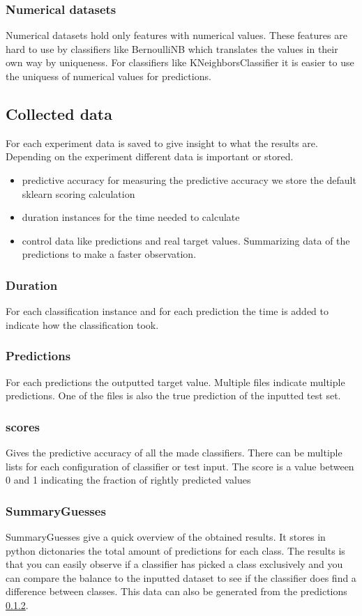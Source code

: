 \documentclass[a4paper,10pt]{article}
\begin{document}
\subsubsection{Numerical datasets}
Numerical datasets hold only features with numerical values. These features are hard to use by classifiers like BernoulliNB which translates the values in their own way by uniqueness. For classifiers like KNeighborsClassifier it is easier to use the uniquess of numerical values for predictions.

\subsection{Collected data}
For each experiment data is saved to give insight to what the results are. Depending on the experiment different data is important or stored. 
\begin{itemize}
	\item predictive accuracy for measuring the predictive accuracy we store the default sklearn scoring calculation
	\item duration instances for the time needed to calculate 
	\item control data like predictions and real target values. Summarizing data of the predictions to make a faster observation. 
\end{itemize}
\subsubsection{Duration}
For each classification instance and for each prediction the time is added to indicate how the classification took. 

\subsubsection{Predictions}\label{pred}
For each predictions the outputted target value. Multiple files indicate multiple predictions. One of the files is also the true prediction of the inputted test set. 

\subsubsection{scores}
Gives the predictive accuracy of all the made classifiers. There can be multiple lists for each configuration of classifier or test input. The score is a value between 0 and 1 indicating the fraction of rightly predicted values

\subsubsection{SummaryGuesses}
SummaryGuesses give a quick overview of the obtained results. It stores in python dictonaries the total amount of predictions for each class. The results is that you can easily observe if a classifier has picked a class exclusively and you can compare the balance to the inputted dataset to see if the classifier does find a difference between classes. This data can also be generated from the predictions \ref{pred}.
\end{document}
